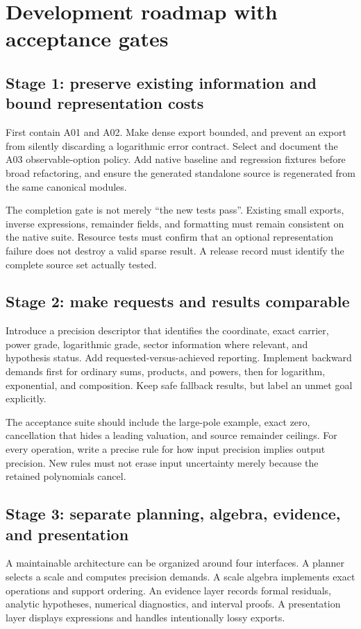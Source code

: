 \documentclass[11pt,a4paper]{article}
\begin{document}
\section{Development roadmap with acceptance gates}
\label{sec:roadmap}
\subsection{Stage 1: preserve existing information and bound representation costs}
First contain A01 and A02. Make dense export bounded, and prevent an export
from silently discarding a logarithmic error contract. Select and document
the A03 observable-option policy. Add native baseline and regression
fixtures before broad refactoring, and ensure the generated standalone
source is regenerated from the same canonical modules.

The completion gate is not merely ``the new tests pass''. Existing small
exports, inverse expressions, remainder fields, and formatting must remain
consistent on the native suite. Resource tests must confirm that an optional
representation failure does not destroy a valid sparse result. A release
record must identify the complete source set actually tested.

\subsection{Stage 2: make requests and results comparable}
Introduce a precision descriptor that identifies the coordinate, exact
carrier, power grade, logarithmic grade, sector information where relevant,
and hypothesis status. Add requested-versus-achieved reporting. Implement
backward demands first for ordinary sums, products, and powers, then for
logarithm, exponential, and composition. Keep safe fallback results, but
label an unmet goal explicitly.

The acceptance suite should include the large-pole example, exact zero,
cancellation that hides a leading valuation, and source remainder ceilings.
For every operation, write a precise rule for how input precision implies
output precision. New rules must not erase input uncertainty merely because
the retained polynomials cancel.

\subsection{Stage 3: separate planning, algebra, evidence, and presentation}
A maintainable architecture can be organized around four interfaces. A
planner selects a scale and computes precision demands. A scale algebra
implements exact operations and support ordering. An evidence layer records
formal residuals, analytic hypotheses, numerical diagnostics, and interval
proofs. A presentation layer displays expressions and handles intentionally
lossy exports.
\end{document}
